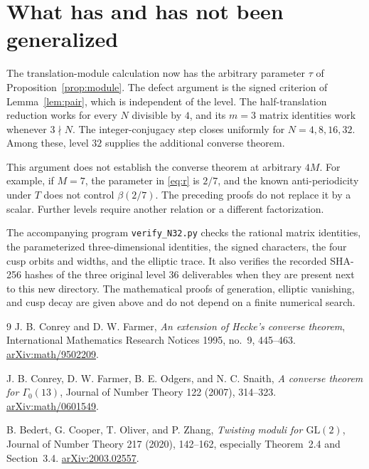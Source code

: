 \documentclass[11pt]{article}
\theoremstyle{remark}
\newcommand{\bb}{\beta}
\begin{document}
\section{What has and has not been generalized}

The translation-module calculation now has the arbitrary parameter
$\tau$ of Proposition~\ref{prop:module}. The defect argument is the
signed criterion of Lemma~\ref{lem:pair}, which is independent of the
level. The half-translation reduction works for every $N$ divisible
by $4$, and its $m=3$ matrix identities work whenever $3\nmid N$.
The integer-conjugacy step closes uniformly for $N=4,8,16,32$.
Among these, level $32$ supplies the additional converse theorem.

This argument does not establish the converse theorem at arbitrary
$4M$. For example, if $M=7$, the parameter in \eqref{eq:r} is $2/7$,
and the known anti-periodicity under $T$ does not control
$\bb(2/7)$. The preceding proofs do not replace it by a scalar.
Further levels require another relation or a different factorization.

The accompanying program \texttt{verify\_N32.py} checks the rational
matrix identities, the parameterized three-dimensional identities,
the signed characters, the four cusp orbits and widths, and the
elliptic trace. It also verifies the recorded SHA-256 hashes of the
three original level $36$ deliverables when they are present next to
this new directory. The mathematical proofs of generation, elliptic
vanishing, and cusp decay are given above and do not depend on a
finite numerical search.

\begin{thebibliography}{9}
J. B. Conrey and D. W. Farmer,
\emph{An extension of Hecke's converse theorem},
International Mathematics Research Notices 1995, no.~9, 445--463.
\href{https://arxiv.org/abs/math/9502209}{arXiv:math/9502209}.

J. B. Conrey, D. W. Farmer, B. E. Odgers, and N. C. Snaith,
\emph{A converse theorem for $\Gamma_0(13)$},
Journal of Number Theory 122 (2007), 314--323.
\href{https://arxiv.org/abs/math/0601549}{arXiv:math/0601549}.

B. Bedert, G. Cooper, T. Oliver, and P. Zhang,
\emph{Twisting moduli for $\mathrm{GL}(2)$},
Journal of Number Theory 217 (2020), 142--162,
especially Theorem~2.4 and Section~3.4.
\href{https://arxiv.org/abs/2003.02557}{arXiv:2003.02557}.
\end{thebibliography}
\end{document}
